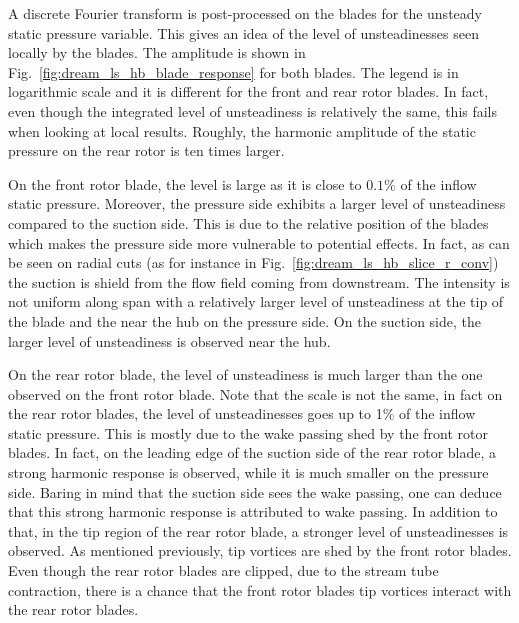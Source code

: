 A discrete Fourier transform is post-processed on the blades
for the unsteady static pressure variable. This gives an
idea of the level of unsteadinesses seen locally by the blades.
The amplitude is shown in 
Fig.~\ref{fig:dream_ls_hb_blade_response} for both blades.
The legend is in logarithmic scale and it is different
for the front and rear rotor blades. In fact, even though the
integrated level of unsteadiness is relatively the same, this
fails when looking at local results. Roughly, the harmonic
amplitude of the static pressure on the rear rotor is
ten times larger. 


On the front rotor blade, the level is large as it is
close to $0.1\%$ of the inflow static pressure.
Moreover, the pressure side
exhibits a larger level of unsteadiness compared to the
suction side. This is due to the relative position of the
blades which makes the pressure side more vulnerable to
potential effects. In fact, as can be seen on radial cuts
(as for instance in Fig.~\ref{fig:dream_ls_hb_slice_r_conv})
the suction is shield from the flow
field coming from downstream. The intensity is not
uniform along span with a relatively larger level of
unsteadiness at the tip of the blade and the near the hub
on the pressure side. On the suction side, the larger level
of unsteadiness is observed near the hub.


On the rear rotor blade, the level
of unsteadiness is much larger than the one observed on
the front rotor blade. Note that the scale is not the same, 
in fact on the rear rotor blades, the level of unsteadinesses
goes up to 1\% of the inflow static pressure.
This is mostly due to the wake passing
shed by the front rotor blades. In fact, on the leading
edge of the suction side of the rear rotor blade, 
a strong harmonic response is observed, while it is 
much smaller on the pressure side. Baring in mind that 
the suction side sees the wake passing, one can deduce
that this strong harmonic response is attributed to wake passing.
In addition to that, in the tip region of the rear rotor blade, 
a stronger level of unsteadinesses is observed. As mentioned
previously, tip vortices are shed by the front rotor blades.
Even though the rear rotor blades are clipped, due to
the stream tube contraction, there is a chance that
the front rotor blades tip vortices interact with the 
rear rotor blades.

